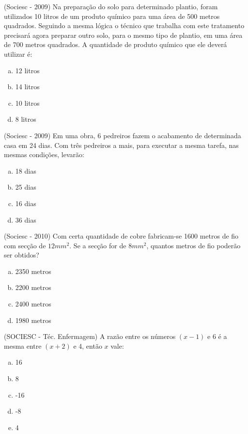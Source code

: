   \begin{exer} (Sociesc - 2009) Na preparação do solo para determinado plantio, foram utilizados 10 litros de um produto químico para uma área de 500 metros quadrados. Seguindo a mesma lógica o técnico que trabalha
 com este tratamento precisará agora preparar outro solo, para o mesmo tipo de plantio, em uma área de 700 metros quadrados. A quantidade de produto químico que ele deverá utilizar é:
 \begin{enumerate}[a)]
  \item 12 litros
  \item 14 litros
  \item 10 litros
  \item 8 litros
 \end{enumerate}
 \end{exer}

 \begin{exer} (Sociesc - 2009) Em uma obra, 6 pedreiros fazem o acabamento de determinada casa em 24 dias. Com três pedreiros a mais, para executar a mesma tarefa, nas mesmas condições, levarão:
  \begin{enumerate}[a)]
  \item 18 dias
  \item 25 dias
  \item 16 dias
  \item 36 dias
 \end{enumerate}
 \end{exer}

 \begin{exer} (Sociesc - 2010) Com certa quantidade de cobre fabricam-se 1600 metros de fio com secção de $12 mm^2$. Se a secção for de $8mm^2$, quantos metros de fio poderão ser obtidos?
  \begin{enumerate}[a)]
  \item 2350 metros
  \item 2200 metros
  \item 2400 metros
  \item 1980 metros
 \end{enumerate}
 \end{exer}

 \begin{exer} (SOCIESC - Téc. Enfermagem) A razão entre os números $(x-1)$ e 6 é a mesma entre $(x+2)$ e 4, então $x$ vale:
  \begin{enumerate}[a)]
  \item 16
  \item 8
  \item -16
  \item -8
  \item 4
 \end{enumerate}
 \end{exer}

